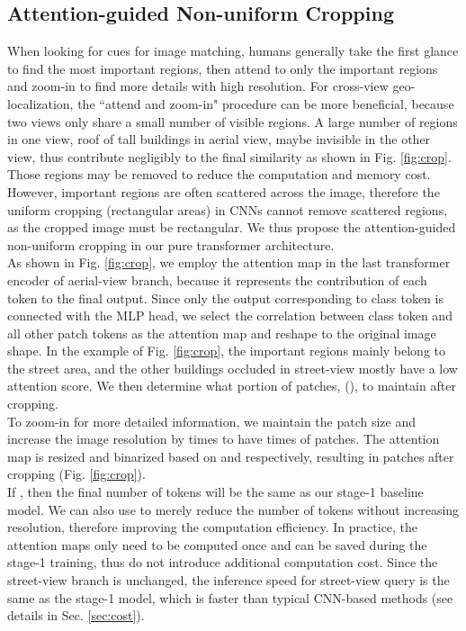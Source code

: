 \documentclass[10pt,twocolumn,letterpaper]{article}
\begin{document}
\subsection{Attention-guided Non-uniform Cropping}
\label{sec:crop}

When looking for cues for image matching, humans generally take the first glance to find the most important regions, then attend to only the important regions and zoom-in to find more details with high resolution. For cross-view geo-localization, the ``attend and zoom-in" procedure can be more beneficial, because two views only share a small number of visible regions. A large number of regions in one view, \eg roof of tall buildings in aerial view, maybe invisible in the other view, thus  contribute negligibly to the final similarity as shown in Fig. \ref{fig:crop}. Those regions may be removed to reduce the computation and memory cost. However, important regions are often scattered across the image, therefore the uniform cropping (\ie rectangular areas) in CNNs cannot remove scattered regions, as the cropped image must be rectangular. We thus propose the attention-guided non-uniform cropping 
in our pure transformer architecture. \\
\indent As shown in Fig. \ref{fig:crop}, we employ the attention map in the last  transformer encoder of aerial-view branch, because it represents the contribution of each token to the final output. Since only the output corresponding to class token is connected with the MLP head, we select the correlation between class token and all other patch tokens as the attention map and reshape to the original image shape. In the example of Fig. \ref{fig:crop}, the important regions mainly belong to the street area, and the other buildings occluded in street-view mostly have a low attention score. We then determine what portion of patches,  (\eg ), to maintain after cropping. \\
\indent To zoom-in for more detailed information, we maintain the patch size  and increase the image resolution by  times to have  times of patches. The attention map is resized and binarized based on  and  respectively, resulting in  patches after cropping (Fig. \ref{fig:crop}).   \\
\indent If , then the final number of tokens will be the same as our stage-1 baseline model. We can also use  to merely reduce the number of tokens without increasing resolution, therefore improving the computation efficiency. 
In practice, the attention maps only need to be computed once and can be saved during the stage-1 training, thus do not introduce additional computation cost. Since the street-view branch is unchanged, the inference speed for street-view query is the same as the stage-1 model, which is faster than typical CNN-based methods (see details in Sec. \ref{sec:cost}).
\end{document}
